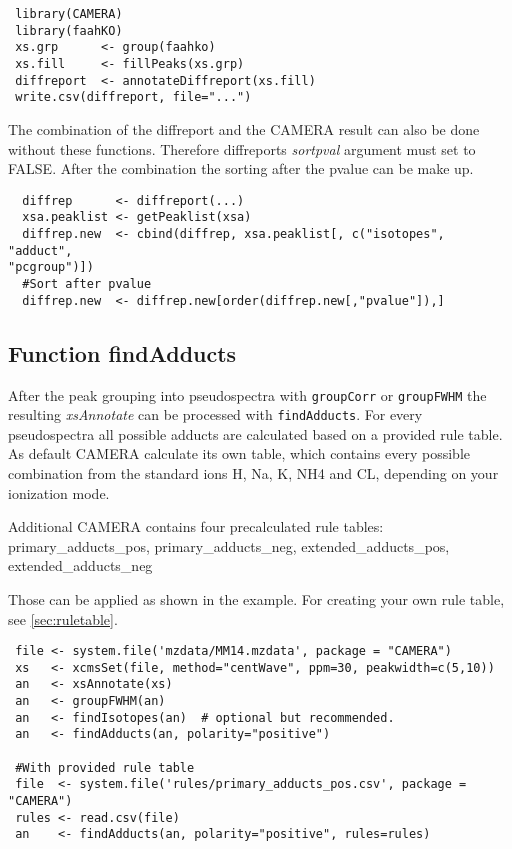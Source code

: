 \documentclass[a4paper,12pt]{article}
\newcommand{\Rfunction}[1]{{\texttt{#1}}}
\newcommand{\Rclass}[1]{{\textit{#1}}}
\newcommand{\Rfunarg}[1]{{\textit{#1}}}
\begin{document}
\begin{verbatim}
 library(CAMERA)
 library(faahKO)
 xs.grp      <- group(faahko)
 xs.fill     <- fillPeaks(xs.grp)
 diffreport  <- annotateDiffreport(xs.fill)
 write.csv(diffreport, file="...")
\end{verbatim}

The combination of the diffreport and the CAMERA result can also be done
without these functions. Therefore diffreports \Rfunarg{sortpval} argument must set to
FALSE. After the combination the sorting after the pvalue can be make up.

\begin{verbatim}
  diffrep      <- diffreport(...)
  xsa.peaklist <- getPeaklist(xsa)
  diffrep.new  <- cbind(diffrep, xsa.peaklist[, c("isotopes", "adduct",
"pcgroup")])
  #Sort after pvalue
  diffrep.new  <- diffrep.new[order(diffrep.new[,"pvalue"]),]
\end{verbatim}

\subsection{Function findAdducts}
\label{sec:findAdducts}
After the peak grouping into pseudospectra with \Rfunction{groupCorr} or
\Rfunction{groupFWHM} the resulting \Rclass{xsAnnotate} can be processed with
\Rfunction{findAdducts}. For every pseudospectra all possible adducts are
calculated based on a provided rule table. As default CAMERA calculate its own
table, which contains every possible combination from the standard ions
H, Na, K, NH4 and CL, depending on your ionization mode.

Additional CAMERA contains four precalculated rule tables: primary\_adducts\_pos,
primary\_adducts\_neg, extended\_adducts\_pos, extended\_adducts\_neg

Those can be applied as shown in the example. For creating your own rule
table, see \ref{sec:ruletable}.

\begin{verbatim}
 file <- system.file('mzdata/MM14.mzdata', package = "CAMERA")
 xs   <- xcmsSet(file, method="centWave", ppm=30, peakwidth=c(5,10))
 an   <- xsAnnotate(xs)
 an   <- groupFWHM(an)
 an   <- findIsotopes(an)  # optional but recommended.
 an   <- findAdducts(an, polarity="positive")
 
 #With provided rule table
 file  <- system.file('rules/primary_adducts_pos.csv', package = "CAMERA")
 rules <- read.csv(file)
 an    <- findAdducts(an, polarity="positive", rules=rules)
\end{verbatim}
\end{document}
